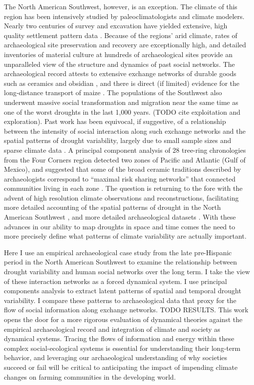 \documentclass[10pt]{iopart}
\begin{document}
The North American Southwest, however, is an exception. The climate of this region has been intensively studied by paleoclimatologists and climate modelers. Nearly two centuries of survey and excavation have yielded extensive, high quality settlement pattern data \parencite{Hill2004}. Because of the regions' arid climate, rates of archaeological site preservation and recovery are exceptionally high, and detailed inventories of material culture at hundreds of archaeological sites provide an unparalleled view of the structure and dynamics of past social networks. The archaeological record attests to extensive exchange networks of durable goods such as ceramics and obsidian \parencite{Mills2013a}, and there is direct (if limited) evidence for the long-distance transport of maize \parencite{Benson2010, Benson2010WhoDrought}. The populations of the Southwest also underwent massive social transformation and migration near the same time as one of the worst droughts in the last 1,000 years. (TODO cite exploitation and exploration). Past work has been equivocal, if suggestive, of a relationship between the intensity of social interaction along such exchange networks and the spatial patterns of drought variability, largely due to small sample sizes and sparse climate data \parencite{Rautman1993a,Johnson1990ChumashAnalysis}. A principal component analysis of 28 tree-ring chronologies from the Four Corners region detected two zones of Pacific and Atlantic (Gulf of Mexico), and suggested that some of the broad ceramic traditions described by archaeologists correspond to ``maximal risk sharing networks'' that connected communities living in each zone \parencite{Cordell2007}. The question is returning to the fore with the advent of high resolution climate observations and reconstructions, facilitating more detailed accounting of the spatial patterns of drought in the North American Southwest \parencite{Strawhacker2017RiskProvince}, and more detailed archaeological datasets \parencite{Borck2015}. With these advances in our ability to map droughts in space and time comes the need to more precisely define what patterns of climate variability are actually important.

Here I use an empirical archaeological case study from the late pre-Hispanic period in the North American Southwest to examine the relationship between drought variability and human social networks over the long term. I take the view of these interaction networks as a forced dynamical system. I use principal components analysis to extract latent patterns of spatial and temporal drought variability. I compare these patterns to archaeological data that proxy for the flow of social information along exchange networks. TODO RESULTS. This work opens the door for a more rigorous evaluation of dynamical theories against the empirical archaeological record and integration of climate and society as dynamical systems. Tracing the flows of information and energy within these complex social-ecological systems is essential for understanding their long-term behavior, and leveraging our archaeological understanding of why societies succeed or fail will be critical to anticipating the impact of impending climate changes on farming communities in the developing world.
\end{document}
